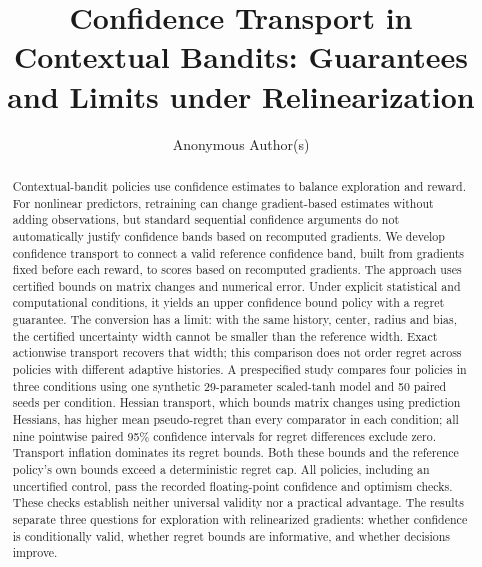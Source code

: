 \documentclass[twoside]{article}
\title{Confidence Transport in Contextual Bandits: Guarantees and Limits under Relinearization}
\author{Anonymous Author(s)}
\newif\ifprovisional\provisionalfalse %
\begin{document}
\ifprovisional
  \maketitle
\else
\fi

\begin{abstract}
Contextual-bandit policies use confidence estimates to balance exploration and
reward. For nonlinear predictors, retraining can change gradient-based estimates
without adding observations, but standard sequential confidence arguments do not
automatically justify confidence bands based on recomputed gradients. We develop
confidence transport
to connect a valid reference confidence band, built from gradients fixed before
each reward, to scores based on recomputed gradients. The approach uses certified
bounds on matrix changes and numerical error. Under explicit statistical and
computational conditions, it yields an upper confidence bound policy with a regret
guarantee. The conversion has a limit: with the same history, center, radius and
bias, the certified uncertainty width cannot be smaller than the reference width.
Exact actionwise transport recovers that width; this comparison does not order
regret across policies with different adaptive histories.
A prespecified study compares four policies in three conditions using one
synthetic 29-parameter scaled-tanh model and 50 paired seeds per condition.
Hessian transport, which bounds matrix changes using prediction Hessians, has
higher mean pseudo-regret than every comparator in each condition; all nine
pointwise paired 95\% confidence intervals for regret differences exclude zero.
Transport inflation dominates its regret bounds. Both these bounds and the
reference policy's own bounds exceed a deterministic regret cap.
All policies, including an uncertified control, pass the recorded floating-point
confidence and optimism checks. These checks establish neither universal validity
nor a practical advantage. The results separate three questions for exploration
with relinearized gradients: whether confidence is conditionally valid, whether
regret bounds are informative, and whether decisions improve.
\end{abstract}
\end{document}
